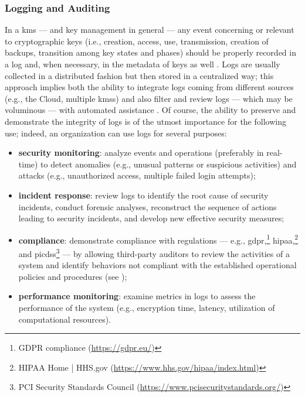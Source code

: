 \subsubsection{Logging and Auditing}\label{sec:further:key_management:logging}

In a \gls{kms} --- and key management in general --- any event concerning or relevant to cryptographic keys (i.e., creation, access, use, transmission, creation of backups, transition among key states and phases) should be properly recorded in a log and, when necessary, in the metadata of keys as well \cite{barker_profile_2015}. Logs are usually collected in a distributed fashion but then stored in a centralized way; this approach implies both the ability to integrate logs coming from different sources (e.g., the Cloud, multiple \glspl{kms}) and also filter and review logs --- which may be voluminous --- with automated assistance \cite{csa_key_2020}. Of course, the ability to preserve and demonstrate the integrity of logs is of the utmost importance for the following use; indeed, an organization can use logs for several purposes:

\begin{itemize}
	\item \textbf{security monitoring}: analyze events and operations (preferably in real-time) to detect anomalies (e.g., unusual patterns or suspicious activities) and attacks (e.g., unauthorized access, multiple failed login attempts);
	\item \textbf{incident response}: review logs to identify the root cause of security incidents, conduct forensic analyses, reconstruct the sequence of actions leading to security incidents, and develop new effective security measures;
	\item \textbf{compliance}: demonstrate compliance with regulations --- e.g., \gls{gdpr},\footnote{GDPR compliance (\url{https://gdpr.eu/})} \gls{hipaa},\footnote{HIPAA Home | HHS.gov (\url{https://www.hhs.gov/hipaa/index.html})} and \gls{picdss}\footnote{PCI Security Standards Council (\url{https://www.pcisecuritystandards.org/})} --- by allowing third-party auditors to review the activities of a system and identify behaviors not compliant with the established operational policies and procedures (see );	
	\item \textbf{performance monitoring}: examine metrics in logs to assess the performance of the system (e.g., encryption time, latency, utilization of computational resources).
\end{itemize}

